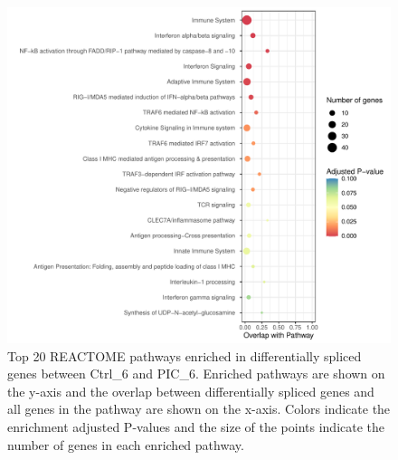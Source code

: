 \begin{figure}[H]
  \centering
  \includegraphics[width=\textwidth]{ds_PIC_6_vs_Ctrl_6}
  \caption[REACTOME pathways enriched in differentially spliced genes (PIC\_6 versus Ctrl\_6)]{Top 20 REACTOME pathways enriched in differentially spliced genes between Ctrl\_6 and PIC\_6. Enriched pathways are shown on the y-axis and the overlap between differentially spliced genes and all genes in the pathway are shown on the x-axis. Colors indicate the enrichment adjusted P-values and the size of the points indicate the number of genes in each enriched pathway.}
  \label{fig:ds_PIC_6_vs_Ctrl_6}   
\end{figure}

